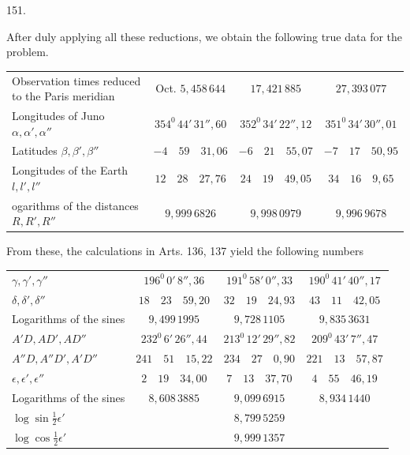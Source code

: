 \par{}\medskip
\hypertarget{native-202-article151}{}
\begin{center}151.\end{center}
After duly applying all these reductions, we obtain the following true data for the problem.
\begin{center}
\footnotesize\setlength{\tabcolsep}{3pt}\renewcommand{\arraystretch}{1.3}
\begin{tabular}{@{}p{12em}|c|c|c@{}}
{\raggedright Observation times reduced to the Paris meridian\par} & Oct. $5{,}458\,644$ & $17{,}421\,885$ & $27{,}393\,077$\\
{\raggedright Longitudes of Juno $\alpha,\alpha',\alpha''$\par} & $354^0\,44'\,31''{,}60$ & $352^0\,34'\,22''{,}12$ & $351^0\,34'\,30''{,}01$\\
{\raggedright Latitudes $\beta,\beta',\beta''$\par} & $-4\quad59\quad31{,}06$ & $-6\quad21\quad55{,}07$ & $-7\quad17\quad50{,}95$\\
{\raggedright Longitudes of the Earth $l,l',l''$\par} & $12\quad28\quad27{,}76$ & $24\quad19\quad49{,}05$ & $34\quad16\quad9{,}65$\\
{\raggedright ogarithms of the distances $R,R',R''$\par} & $9{,}999\,6826$ & $9{,}998\,0979$ & $9{,}996\,9678$\\
\end{tabular}
\end{center}

From these, the calculations in Arts. 136, 137 yield the following numbers
\begin{center}
\footnotesize\setlength{\tabcolsep}{4pt}\renewcommand{\arraystretch}{1.3}
\begin{tabular}{@{}l|c|c|c@{}}
$\gamma,\gamma',\gamma''$ & $196^0\,0'\,8''{,}36$ & $191^0\,58'\,0''{,}33$ & $190^0\,41'\,40''{,}17$\\
$\delta,\delta',\delta''$ & $18\quad23\quad59{,}20$ & $32\quad19\quad24{,}93$ & $43\quad11\quad42{,}05$\\
Logarithms of the sines & $9{,}499\,1995$ & $9{,}728\,1105$ & $9{,}835\,3631$\\
$A'D,AD',AD''$ & $232^0\,6'\,26''{,}44$ & $213^0\,12'\,29''{,}82$ & $209^0\,43'\,7''{,}47$\\
$A''D,A''D',A'D''$ & $241\quad51\quad15{,}22$ & $234\quad27\quad0{,}90$ & $221\quad13\quad57{,}87$\\
$\epsilon,\epsilon',\epsilon''$ & $2\quad19\quad34{,}00$ & $7\quad13\quad37{,}70$ & $4\quad55\quad46{,}19$\\
Logarithms of the sines & $8{,}608\,3885$ & $9{,}099\,6915$ & $8{,}934\,1440$\\
$\log\sin\tfrac12\epsilon'$ & & $8{,}799\,5259$ & \\
$\log\cos\tfrac12\epsilon'$ & & $9{,}999\,1357$ & \\
\end{tabular}
\end{center}

